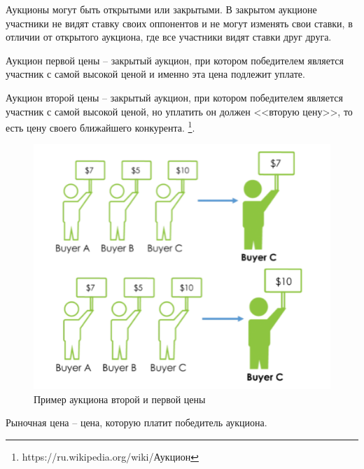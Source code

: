 \documentclass[times,specification,annotation]{itmo-student-thesis}
\begin{document}
Аукционы могут быть открытыми или закрытыми.
В закрытом аукционе участники не видят ставку своих оппонентов и не могут изменять свои ставки,
в отличии от открытого аукциона, где все участники видят ставки друг друга.

\begin{definition}
    Аукцион первой цены – закрытый аукцион, при котором победителем является участник
    с самой высокой ценой и именно эта цена подлежит уплате.
\end{definition}

\begin{definition}
    Аукцион второй цены – закрытый аукцион, при котором победителем является участник с самой высокой ценой,
    но уплатить он должен <<вторую цену>>, то есть цену своего ближайшего конкурента.
    \footnote{\label{fn:auction}https://ru.wikipedia.org/wiki/Аукцион}.
\end{definition}

\begin{figure}[h]
    \label{fig:auction}
    \caption{Пример аукциона второй и первой цены}
    \centering
    \includegraphics{s_f_price-auction.png}
\end{figure}

\begin{definition}
    Рыночная цена – цена, которую платит победитель аукциона.
\end{definition}
\end{document}
